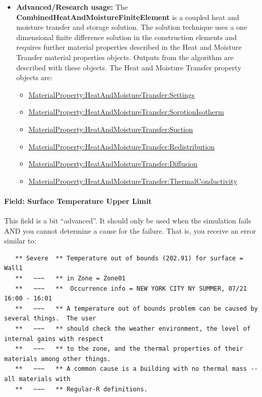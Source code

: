 \begin{itemize}
\begin{itemize}
    \end{itemize}
    \item
    \textbf{Advanced/Research usage:} The \textbf{CombinedHeatAndMoistureFiniteElement} is a coupled heat and moisture transfer and storage solution. The solution technique uses a one dimensional finite difference solution in the construction elements and requires further material properties described in the Heat and Moisture Transfer material properties objects. Outputs from the algorithm are described with these objects. The Heat and Moisture Transfer property objects are:
    \begin{itemize}
        \item
        \hyperref[materialpropertyheatandmoisturetransfersettings]{MaterialProperty:HeatAndMoistureTransfer:Settings}
        \item
        \hyperref[materialpropertyheatandmoisturetransfersorptionisotherm]{MaterialProperty:HeatAndMoistureTransfer:SorptionIsotherm}
        \item
        \hyperref[materialpropertyheatandmoisturetransfersuction]{MaterialProperty:HeatAndMoistureTransfer:Suction}
        \item
        \hyperref[materialpropertyheatandmoisturetransferredistribution]{MaterialProperty:HeatAndMoistureTransfer:Redistribution}
        \item
        \hyperref[materialpropertyheatandmoisturetransferdiffusion]{MaterialProperty:HeatAndMoistureTransfer:Diffusion}
        \item
        \hyperref[materialpropertyheatandmoisturetransferthermalconductivity]{MaterialProperty:HeatAndMoistureTransfer:ThermalConductivity}
    \end{itemize}
\end{itemize}

\paragraph{Field: Surface Temperature Upper Limit}\label{field-surface-temperature-upper-limit}

This field is a bit ``advanced''. It should only be used when the simulation fails AND you cannot determine a cause for the failure. That is, you receive an error similar to:

\begin{lstlisting}
   ** Severe  ** Temperature out of bounds (202.91) for surface = Wall1
   **   ~~~   ** in Zone = Zone01
   **   ~~~   **  Occurrence info = NEW YORK CITY NY SUMMER, 07/21 16:00 - 16:01
   **   ~~~   ** A temperature out of bounds problem can be caused by several things.  The user
   **   ~~~   ** should check the weather environment, the level of internal gains with respect
   **   ~~~   ** to the zone, and the thermal properties of their materials among other things.
   **   ~~~   ** A common cause is a building with no thermal mass -- all materials with
   **   ~~~   ** Regular-R definitions.
\end{lstlisting}

